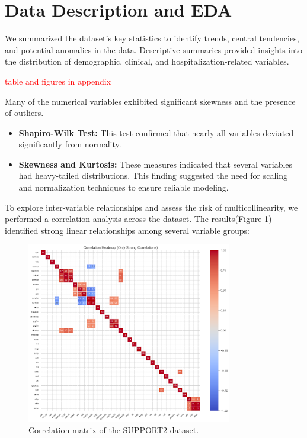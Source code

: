 \section{Data Description and EDA}


We summarized the dataset's key statistics to identify trends, central tendencies, and potential anomalies in the data.
Descriptive summaries provided insights into the distribution of 
demographic, clinical, and hospitalization-related variables.

\textcolor{red}{table and figures in appendix}

Many of the numerical variables exhibited significant skewness and the presence of outliers.

\begin{itemize}
    \item \textbf{Shapiro-Wilk Test:} This test confirmed that nearly all variables deviated significantly from normality.
    \item \textbf{Skewness and Kurtosis:} These measures indicated that several variables had heavy-tailed distributions. This finding suggested the need for scaling and normalization techniques to ensure reliable modeling.
\end{itemize}

To explore inter-variable relationships and assess the risk of multicollinearity,
 we performed a correlation analysis across the dataset. 
The results(Figure \ref{fig:correlation_matrix}) identified strong linear relationships among several variable groups:

\begin{figure}[!h]
    \centering
    \includegraphics[width=0.8\textwidth]{../results/correlation_target.png}
    \caption{Correlation matrix of the SUPPORT2 dataset.}
    \label{fig:correlation_matrix}
\end{figure}

